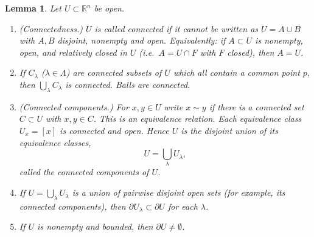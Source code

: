 \documentclass[11pt]{article}
\theoremstyle{plain}
\newtheorem{lemma}[theorem]{Lemma}
\theoremstyle{definition}
\theoremstyle{remark}
\begin{document}
\begin{lemma}\label{lem:topology}
Let $U \subset \mathbb{R}^n$ be open.
\begin{enumerate}
    \item[(a)] \emph{(Connectedness.)} $U$ is called connected if it cannot be written as $U = A \cup B$ with $A, B$ disjoint, nonempty and open. Equivalently: if $A \subset U$ is nonempty, open, and relatively closed in $U$ (i.e.\ $A = U \cap F$ with $F$ closed), then $A = U$.
    \item[(b)] If $C_\lambda$ ($\lambda \in \Lambda$) are connected subsets of $U$ which all contain a common point $p$, then $\bigcup_\lambda C_\lambda$ is connected. Balls are connected.
    \item[(c)] \emph{(Connected components.)} For $x, y \in U$ write $x \sim y$ if there is a connected set $C \subset U$ with $x, y \in C$. This is an equivalence relation. Each equivalence class $U_x = [x]$ is connected and open. Hence $U$ is the disjoint union of its equivalence classes,
    $$ U = \bigcup_\lambda U_\lambda, $$
    called the \emph{connected components} of $U$.
    \item[(d)] If $U = \bigcup_\lambda U_\lambda$ is a union of pairwise disjoint open sets (for example, its connected components), then $\partial U_\lambda \subset \partial U$ for each $\lambda$.
    \item[(e)] If $U$ is nonempty and bounded, then $\partial U \neq \emptyset$.
\end{enumerate}
\end{lemma}
\end{document}
